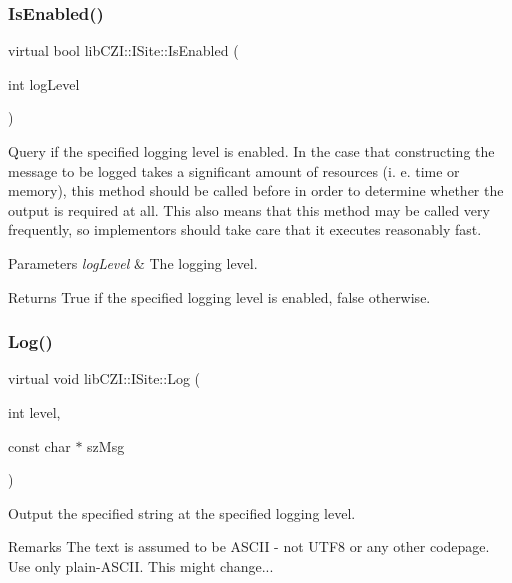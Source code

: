 \subsubsection{\texorpdfstring{Is\+Enabled()}{IsEnabled()}}
{\footnotesize\ttfamily virtual bool lib\+C\+Z\+I\+::\+I\+Site\+::\+Is\+Enabled (\begin{DoxyParamCaption}\item[{int}]{log\+Level }\end{DoxyParamCaption})\hspace{0.3cm}{\ttfamily [pure virtual]}}

Query if the specified logging level is enabled. In the case that constructing the message to be logged takes a significant amount of resources (i. e. time or memory), this method should be called before in order to determine whether the output is required at all. This also means that this method may be called very frequently, so implementors should take care that it executes reasonably fast.


\begin{DoxyParams}{Parameters}
{\em log\+Level} & The logging level.\\
\hline
\end{DoxyParams}
\begin{DoxyReturn}{Returns}
True if the specified logging level is enabled, false otherwise. 
\end{DoxyReturn}
\mbox{\label{classlib_c_z_i_1_1_i_site_aa709ab923626e1a17898b3d6802c2082}} 
\subsubsection{\texorpdfstring{Log()}{Log()}\hspace{0.1cm}{\footnotesize\ttfamily [1/3]}}
{\footnotesize\ttfamily virtual void lib\+C\+Z\+I\+::\+I\+Site\+::\+Log (\begin{DoxyParamCaption}\item[{int}]{level,  }\item[{const char $\ast$}]{sz\+Msg }\end{DoxyParamCaption})\hspace{0.3cm}{\ttfamily [pure virtual]}}

Output the specified string at the specified logging level. \begin{DoxyRemark}{Remarks}
The text is assumed to be A\+S\+C\+II -\/ not U\+T\+F8 or any other codepage. Use only plain-\/\+A\+S\+C\+II. This might change... 
\end{DoxyRemark}

